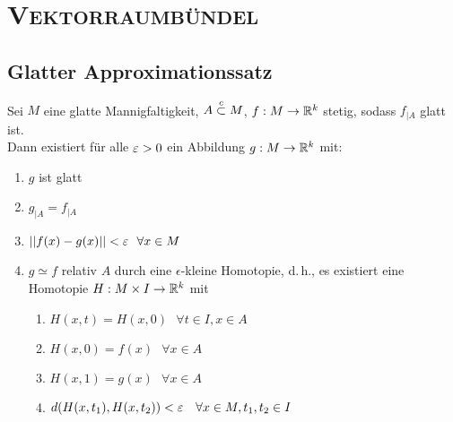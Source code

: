\setcounter{chapter}{3}
\chapter{\textsc{Vektorraumbündel}}
\section{Glatter Approximationssatz}

\Prop{}
Sei $M$ eine glatte Mannigfaltigkeit, $A \overset{c}{\subset} M$, $f : M \overset{}{\rightarrow} \mathbb{R}^k$ stetig, sodass $f_{|A}$ glatt ist.\\
Dann existiert für alle $\varepsilon > 0$ ein Abbildung $g : M \overset{{}}{\rightarrow} \mathbb{R}^k$ mit:
\begin{enumerate}[1.)]
	\item $g$ ist glatt
	\item $g_{|A} = f_{|A}$
	\item $\left|\left|f(x) - g(x)\right|\right| < \varepsilon ~~\forall x \in M$
	\item $g \simeq f$ relativ $A$ durch eine $\epsilon$-kleine Homotopie, d.\,h., es existiert eine Homotopie $H : M \times I \overset{}{\rightarrow} \mathbb{R}^k$ mit
	\begin{enumerate}
		\item $H(x,t) = H(x,0) ~~~\forall t \in I,x \in A $
		\item $H(x,0) = f(x)~~~\forall x \in A$
		\item $H(x,1) = g(x)~~~\forall x \in A$
		\item $d(H(x,t_1), H(x, t_2)) < \varepsilon ~~~ \forall x \in M, t_1, t_2 \in I $
	\end{enumerate} 
\end{enumerate}
